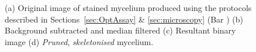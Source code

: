 \begin{figure}[tb]
	\centering
	\hspace{0.2cm}
	\hspace{0.2cm}
	\hspace{0.2cm}
  \caption{(a) Original image of stained mycelium produced using the protocols described in Sections~\ref{sec:OptAssay} \& \ref{sec:microscopy} (Bar ) (b) Background subtracted and median filtered (c) Resultant binary image (d) \emph{Pruned}, \emph{skeletonised} mycelium.}
  \label{fig:MyceliaProc}
\end{figure}

